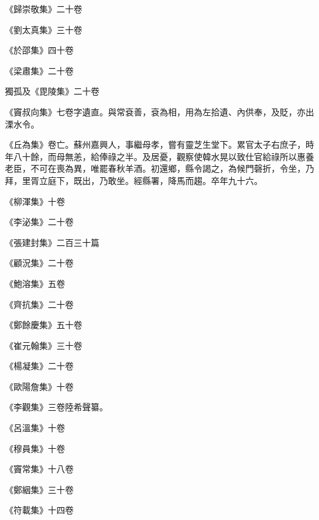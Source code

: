 \begin{pinyinscope}
 《歸崇敬集》二十卷



 《劉太真集》三十卷



 《於邵集》四十卷



 《梁肅集》二十卷



 獨孤及《毘陵集》二十卷



 《竇叔向集》七卷字遺直。與常袞善，袞為相，用為左拾遺、內供奉，及貶，亦出溧水令。



 《丘為集》卷亡。蘇州嘉興人，事繼母孝，嘗有靈芝生堂下。累官太子右庶子，時年八十餘，而母無恙，給俸祿之半。及居憂，觀察使韓水晃以致仕官給祿所以惠養老臣，不可在喪為異，唯罷春秋羊酒。初還鄉，縣令謁之，為候門磬折，令坐，乃拜，里胥立庭下，既出，乃敢坐。經縣署，降馬而趨。卒年九十六。



 《柳渾集》十卷



 《李泌集》二十卷



 《張建封集》二百三十篇



 《顧況集》二十卷



 《鮑溶集》五卷



 《齊抗集》二十卷



 《鄭餘慶集》五十卷



 《崔元翰集》三十卷



 《楊凝集》二十卷



 《歐陽詹集》十卷



 《李觀集》三卷陸希聲纂。



 《呂溫集》十卷



 《穆員集》十卷



 《竇常集》十八卷



 《鄭絪集》三十卷



 《符載集》十四卷




\end{pinyinscope}

